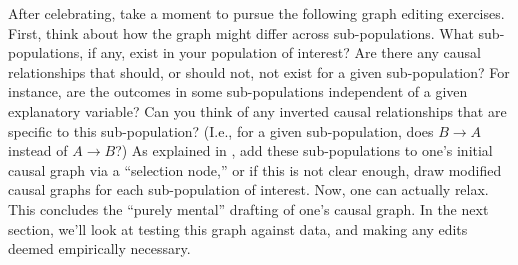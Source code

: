 After celebrating, take a moment to pursue the following graph editing exercises.
First, think about how the graph might differ across sub-populations.
What sub-populations, if any, exist in your population of interest?
Are there any causal relationships that should, or should not, not exist for a given sub-population?
For instance, are the outcomes in some sub-populations independent of a given explanatory variable?
Can you think of any inverted causal relationships that are specific to this sub-population?
(I.e., for a given sub-population, does $B \rightarrow A$ instead of $A \rightarrow B$?)
As explained in \citet[Sec. 4]{druzdzel_2003_combining},
add these sub-populations to one's initial causal graph via a ``selection node,''
or if this is not clear enough,
draw modified causal graphs for each sub-population of interest.
Now, one can actually relax.
This concludes the ``purely mental'' drafting of one's causal graph.
In the next section, we'll look at testing this graph against data, and making any edits deemed empirically necessary.
